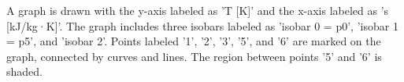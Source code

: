 A graph is drawn with the y-axis labeled as 'T [K]' and the x-axis labeled as 's [kJ/kg·K]'. The graph includes three isobars labeled as 'isobar 0 = p0', 'isobar 1 = p5', and 'isobar 2'. Points labeled '1', '2', '3', '5', and '6' are marked on the graph, connected by curves and lines. The region between points '5' and '6' is shaded.
